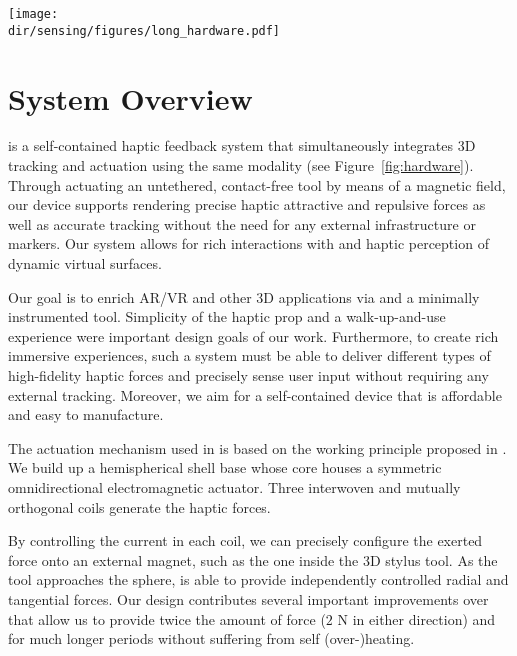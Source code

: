 \begin{figure*}[!t]
    \centering
    \texttt{[image: \\dir/sensing/figures/long\_hardware.pdf]}
   \caption{Overview of our system. A 3D printed base contains the 3 DoF intertwined coils and the circular PCB with an array of eight hall sensors. Arbitrarily shapes tools can be 3D printed and augmented with a permanent magnet, to interact with \omniUIST.}
    \label{fig:hardware}
\end{figure*}

\section{System Overview}

\omniUIST is a self-contained haptic feedback system that simultaneously integrates 3D tracking and actuation using the same modality (see Figure~\ref{fig:hardware}).
Through actuating an untethered, contact-free tool by means of a magnetic field, our device supports rendering precise haptic attractive and repulsive forces as well as accurate tracking without the need for any external infrastructure or markers. Our system allows for rich interactions with and haptic perception of dynamic virtual surfaces.

Our goal is to enrich AR/VR and other 3D applications via \omniUIST and a minimally instrumented tool. Simplicity of the haptic prop and a walk-up-and-use experience were important design goals of our work. Furthermore, to create rich immersive experiences, such a system must be able to deliver different types of high-fidelity haptic forces and precisely sense user input without requiring any external tracking. Moreover, we aim for a self-contained device that is affordable and easy to manufacture.

The actuation mechanism used in \omniUIST is based on the working principle proposed in \cite{zarate2020contact}. We build up a hemispherical shell base whose core houses a symmetric omnidirectional electromagnetic actuator. Three interwoven and mutually orthogonal coils generate the haptic forces.

By controlling the current in each coil, we can precisely configure the exerted force onto an external magnet, such as the one inside the 3D stylus tool. As the tool approaches the sphere, \omniUIST is able to provide independently controlled radial and tangential forces. Our design contributes several important improvements over \cite{zarate2020contact} that allow us to provide twice the amount of force ($2$ N in either direction) and for much longer periods without suffering from self (over-)heating. %

